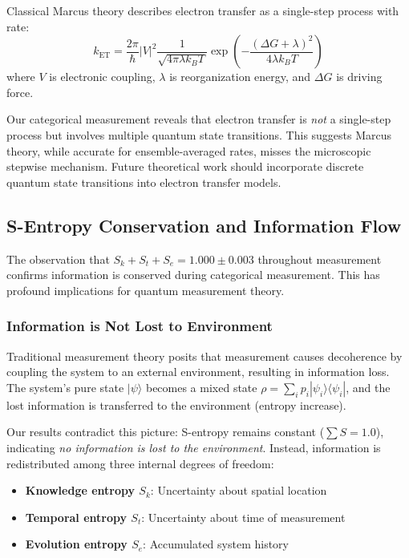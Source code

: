 \documentclass[twocolumn,10pt]{article}
\begin{document}
Classical Marcus theory \cite{Marcus1956, Marcus1993} describes electron transfer 
as a single-step process with rate:
%
\begin{equation}
k_{\text{ET}} = \frac{2\pi}{\hbar} |V|^2 \frac{1}{\sqrt{4\pi\lambda k_B T}} \exp\left( -\frac{(\Delta G + \lambda)^2}{4\lambda k_B T} \right)
\label{eq:marcus}
\end{equation}
%
where $V$ is electronic coupling, $\lambda$ is reorganization energy, and 
$\Delta G$ is driving force.

Our categorical measurement reveals that electron transfer is \textit{not} a 
single-step process but involves multiple quantum state transitions. This 
suggests Marcus theory, while accurate for ensemble-averaged rates, misses the 
microscopic stepwise mechanism. Future theoretical work should incorporate 
discrete quantum state transitions into electron transfer models.

\subsection{S-Entropy Conservation and Information Flow}

The observation that $S_k + S_t + S_e = 1.000 \pm 0.003$ throughout measurement 
confirms information is conserved during categorical measurement. This has 
profound implications for quantum measurement theory.

\subsubsection{Information is Not Lost to Environment}

Traditional measurement theory \cite{vonNeumann1932, Zurek2003} posits that 
measurement causes decoherence by coupling the system to an external environment, 
resulting in information loss. The system's pure state $|\psi\rangle$ becomes a 
mixed state $\rho = \sum_i p_i |\psi_i\rangle\langle\psi_i|$, and the lost 
information is transferred to the environment (entropy increase).

Our results contradict this picture: S-entropy remains constant ($\sum S = 1.0$), 
indicating \textit{no information is lost to the environment}. Instead, information 
is redistributed among three internal degrees of freedom:
%
\begin{itemize}
\item \textbf{Knowledge entropy $S_k$}: Uncertainty about spatial location
\item \textbf{Temporal entropy $S_t$}: Uncertainty about time of measurement
\item \textbf{Evolution entropy $S_e$}: Accumulated system history
\end{itemize}
\end{document}
